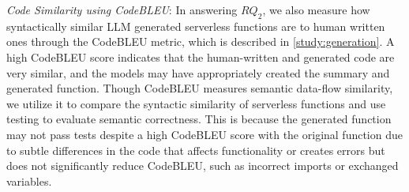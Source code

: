 \textit{Code Similarity using CodeBLEU}: In answering $RQ_{2}$, we also measure how syntactically similar LLM generated serverless functions are to human written ones through the CodeBLEU \cite{ren2020codebleu} metric, which is described in \ref{study:generation}. A high CodeBLEU score indicates that the human-written and generated code are very similar, and the models may have appropriately created the summary and generated function. Though CodeBLEU measures semantic data-flow similarity, we utilize it to compare the syntactic similarity of serverless functions and use testing to evaluate semantic correctness. This is because the generated function may not pass tests despite a high CodeBLEU score with the original function due to subtle differences in the code that affects functionality or creates errors but does not significantly reduce CodeBLEU, such as incorrect imports or exchanged variables. \\
